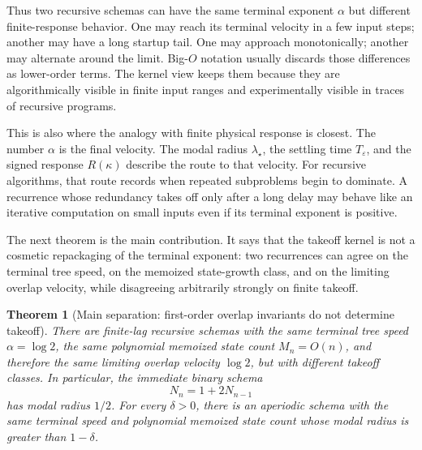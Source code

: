 \documentclass[10pt,twocolumn]{article}
\newtheorem{theorem}{Theorem}
\begin{document}
Thus two recursive schemas can have the same terminal exponent \(\alpha\) but different finite-response behavior.  One may reach its terminal velocity in a few input steps; another may have a long startup tail.  One may approach monotonically; another may alternate around the limit.  Big-\(O\) notation usually discards those differences as lower-order terms.  The kernel view keeps them because they are algorithmically visible in finite input ranges and experimentally visible in traces of recursive programs.

This is also where the analogy with finite physical response is closest.  The number \(\alpha\) is the final velocity.  The modal radius \(\lambda_\star\), the settling time \(T_\varepsilon\), and the signed response \(R(\kappa)\) describe the route to that velocity.  For recursive algorithms, that route records when repeated subproblems begin to dominate.  A recurrence whose redundancy takes off only after a long delay may behave like an iterative computation on small inputs even if its terminal exponent is positive.

The next theorem is the main contribution.  It says that the takeoff kernel is not a cosmetic repackaging of the terminal exponent: two recurrences can agree on the terminal tree speed, on the memoized state-growth class, and on the limiting overlap velocity, while disagreeing arbitrarily strongly on finite takeoff.

\begin{theorem}[Main separation: first-order overlap invariants do not determine takeoff]\label{thm:separation}
There are finite-lag recursive schemas with the same terminal tree speed \(\alpha=\log2\), the same polynomial memoized state count \(M_n=O(n)\), and therefore the same limiting overlap velocity \(\log2\), but with different takeoff classes.  In particular, the immediate binary schema
\[
        N_n=1+2N_{n-1}
\]
has modal radius \(1/2\).  For every \(\delta>0\), there is an aperiodic schema with the same terminal speed and polynomial memoized state count whose modal radius is greater than \(1-\delta\).
\end{theorem}
\end{document}

